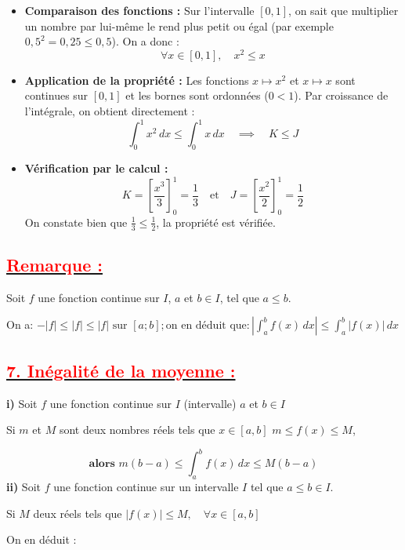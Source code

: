 \documentclass[12pt,a4paper]{article}
\newcounter{exemple}
\begin{document}
\begin{itemize}
    \item \textbf{Comparaison des fonctions :} Sur l'intervalle $[0, 1]$, on sait que multiplier un nombre par lui-même le rend plus petit ou égal (par exemple $0,5^2 = 0,25 \leq 0,5$). On a donc :
    \[ \forall x \in [0, 1], \quad x^2 \leq x \]
    \item \textbf{Application de la propriété :} Les fonctions $x \mapsto x^2$ et $x \mapsto x$ sont continues sur $[0, 1]$ et les bornes sont ordonnées ($0 < 1$). Par croissance de l'intégrale, on obtient directement :
    \[ \int_{0}^{1} x^2 \, dx \leq \int_{0}^{1} x \, dx \quad \implies \quad K \leq J \]
    \item \textbf{Vérification par le calcul :} 
    \[ K = \left[ \frac{x^3}{3} \right]_{0}^{1} = \frac{1}{3} \quad \text{et} \quad J = \left[ \frac{x^2}{2} \right]_{0}^{1} = \frac{1}{2} \]
    On constate bien que $\frac{1}{3} \leq \frac{1}{2}$, la propriété est vérifiée.
\end{itemize}

\subsection*{\underline{\textbf{\textcolor{red}{Remarque :}}}}

Soit \( f \) une fonction continue sur \( I \), \( a \) et \( b \in I \), tel que \( a \leq b \).

On a: \( -|f| \leq |f| \leq |f| \text{ sur } [a ; b] ; \text{on en déduit que} : \left| \int_a^b f(x) \, dx \right| \leq \int_a^b |f(x)| \, dx\)

\subsection*{\underline{\textbf{\textcolor{red}{7. Inégalité de la moyenne :}}}}

\textbf{i)} Soit \( f \) une fonction continue sur \( I \) (intervalle) \( a \) et \( b \in I \)

Si \( m \) et \( M \) sont deux nombres réels tels que \( x \in [a, b] \) \( m \leq f(x) \leq M \),  

\[
\textbf{alors }m (b - a) \leq \int_a^b f(x) \, dx \leq M(b - a)
\]  
\textbf{ii)} Soit \( f \) une fonction continue sur un intervalle \( I \) tel que \( a \leq b \in I \).

Si  \( M \) deux réels tels que \(|f(x)| \leq M, \quad \forall x \in [a,b]\)

On en déduit :
\end{document}
